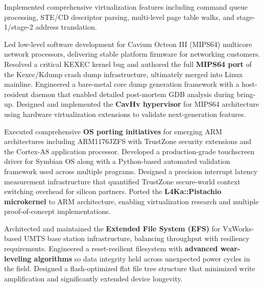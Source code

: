 \documentclass[12pt,a4paper]{pawesome-cv}
\begin{document}
\begin{cventries}
\begin{experiencecontent}
Implemented comprehensive virtualization features including command queue processing, STE/CD descriptor parsing, multi-level page table walks, and stage-1/stage-2 address translation.\end{experiencecontent}
\begin{experiencecontent}
Led low-level software development for Cavium Octeon III (MIPS64) multicore network processors, delivering stable platform firmware for networking customers.
Resolved a critical KEXEC kernel bug and authored the full \textbf{MIPS64 port} of the Kexec/Kdump crash dump infrastructure, ultimately merged into Linux mainline.
Engineered a bare-metal core dump generation framework with a host-resident daemon that enabled detailed post-mortem GDB analysis during bring-up.
Designed and implemented the \textbf{CavHv hypervisor} for MIPS64 architecture using hardware virtualization extensions to validate next-generation features.\end{experiencecontent}
\begin{experiencecontent}
Executed comprehensive \textbf{OS porting initiatives} for emerging ARM architectures including ARM1176JZFS with TrustZone security extensions and the Cortex-A8 application processor.
Developed a production-grade touchscreen driver for Symbian OS along with a Python-based automated validation framework used across multiple programs.
Designed a precision interrupt latency measurement infrastructure that quantified TrustZone secure-world context switching overhead for silicon partners.
Ported the \textbf{L4Ka::Pistachio microkernel} to ARM architecture, enabling virtualization research and multiple proof-of-concept implementations.\end{experiencecontent}
\begin{experiencecontent}
Architected and maintained the \textbf{Extended File System (EFS)} for VxWorks-based UMTS base station infrastructure, balancing throughput with resiliency requirements.
Engineered a reset-resilient filesystem with \textbf{advanced wear-leveling algorithms} so data integrity held across unexpected power cycles in the field.
Designed a flash-optimized flat file tree structure that minimized write amplification and significantly extended device longevity.\end{experiencecontent}

\end{cventries}
\end{document}
